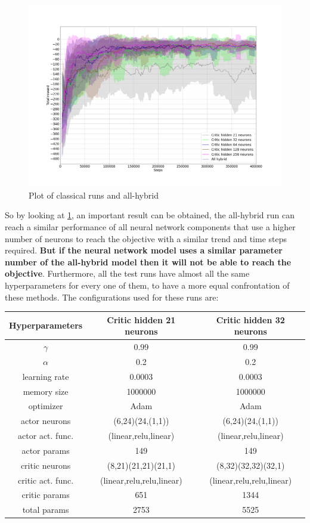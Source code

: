 \begin{figure}[H]
	\centering
	\includegraphics[width=0.95\linewidth]{"img/Best classical vs all hybrid results"}
	\caption{Plot of classical runs and all-hybrid}
	\label{fig:best-classical-vs-all-hybrid-results}
\end{figure}
So by looking at \ref{fig:best-classical-vs-all-hybrid-results}, an important result can be obtained, the all-hybrid run can reach a similar performance of all neural network components that use a higher number of neurons to reach the objective with a similar trend and time steps required. \textbf{But if the neural network model uses a similar parameter number of the all-hybrid model then it will not be able to reach the objective}. Furthermore, all the test runs have almost all the same hyperparameters for every one of them, to have a more equal confrontation of these methods. The configurations used for these runs are:
\newline
\vspace{0.2cm}
\newline
\begin{tabular}{|c|c|c|}
	\hline
	Hyperparameters & Critic hidden 21 neurons & Critic hidden 32 neurons \\
	\hline
	$\gamma$ & 0.99 & 0.99  \\
	\hline
	$\alpha$ & 0.2 & 0.2  \\
	\hline
	learning rate & 0.0003 & 0.0003  \\
	\hline
	memory size & 1000000 & 1000000   \\
	\hline
	optimizer & Adam & Adam  \\
	\hline
	actor neurons & (6,24)(24,(1,1)) & (6,24)(24,(1,1))  \\
	\hline
	actor act. func. & (linear,relu,linear) & (linear,relu,linear) \\
	\hline
	actor params & 149 & 149 \\
	\hline
	critic neurons & (8,21)(21,21)(21,1) & (8,32)(32,32)(32,1)  \\
	\hline
	critic act. func. & (linear,relu,relu,linear) & (linear,relu,relu,linear) \\
	\hline
	critic params & 651 & 1344 \\
	\hline
	total params & 2753 & 5525 \\
	\hline
\end{tabular}
